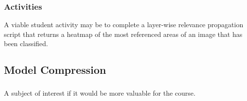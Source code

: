 \documentclass[12pt]{amsart}
\begin{document}
\subsubsection{Activities}
A viable student activity may be to complete a layer-wise relevance propagation script that returns a heatmap
of the most referenced areas of an image that has been classified.


\subsection{Model Compression}
\subsubsection{}
A subject of interest if it would be more valuable for the course.
\end{document}
